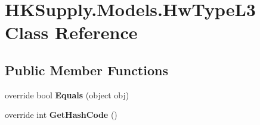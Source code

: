 \hypertarget{class_h_k_supply_1_1_models_1_1_hw_type_l3}{}\section{H\+K\+Supply.\+Models.\+Hw\+Type\+L3 Class Reference}
\label{class_h_k_supply_1_1_models_1_1_hw_type_l3}
\subsection*{Public Member Functions}
\begin{DoxyCompactItemize}
\item 
\mbox{\label{class_h_k_supply_1_1_models_1_1_hw_type_l3_a2414a73fa20cd8b04762d0093b250c29}} 
override bool {\bfseries Equals} (object obj)
\item 
\mbox{\label{class_h_k_supply_1_1_models_1_1_hw_type_l3_a6938a24d2c0d8b2b7a67f56996fb7a1f}} 
override int {\bfseries Get\+Hash\+Code} ()
\end{DoxyCompactItemize}
